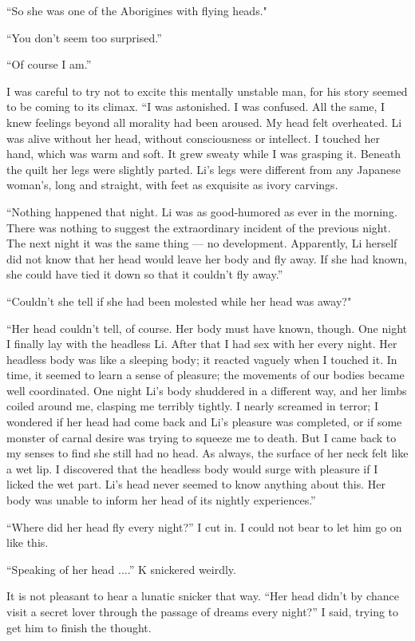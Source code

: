 \documentclass[a6paper]{article}
\begin{document}
“So she was one of the Aborigines with ﬂying heads."

“You don't seem too surprised.”

“Of course I am.”

I was careful to try not to excite this mentally unstable
man, for his story seemed to be coming to its climax.
“I was astonished.  I was confused.  All the same, I knew
feelings beyond all morality had been aroused.  My head felt
overheated.  Li was alive without her head, without consciousness
or intellect.  I touched her hand, which was warm
and soft.  It grew sweaty while I was grasping it.  Beneath
the quilt her legs were slightly parted.  Li's legs were different
from any Japanese woman's, long and straight, with feet
as exquisite as ivory carvings.

“Nothing happened that night.  Li was as good-humored
as ever in the morning.  There was nothing to suggest the
extraordinary incident of the previous night.  The next night
it was the same thing --- no development.  Apparently, Li herself
did not know that her head would leave her body and
fly away.  If she had known, she could have tied it down so
that it couldn't ﬂy away.”

“Couldn't she tell if she had been molested while her
head was away?"

“Her head couldn't tell, of course.  Her body must have
known, though.  One night I ﬁnally lay with the headless Li.
After that I had sex with her every night.  Her headless body
was like a sleeping body; it reacted vaguely when I touched
it.  In time, it seemed to learn a sense of pleasure; the movements
of our bodies became well coordinated.  One night
Li's body shuddered in a different way, and her limbs
coiled around me, clasping me terribly tightly.  I nearly
screamed in terror; I wondered if her head had come back
and Li's pleasure was completed, or if some monster of
carnal desire was trying to squeeze me to death.  But I came
back to my senses to ﬁnd she still had no head.  As always,
the surface of her neck felt like a wet lip.  I discovered that
the headless body would surge with pleasure if I licked the
wet part.  Li's head never seemed to know anything about
this.  Her body was unable to inform her head of its nightly
experiences.”

“Where did her head ﬂy every night?” I cut in.  I could
not bear to let him go on like this.

“Speaking of her head ....” K snickered weirdly.

It is not pleasant to hear a lunatic snicker that way.  “Her
head didn't by chance visit a secret lover through the passage
of dreams every night?” I said, trying to get him to
finish the thought.
\end{document}
